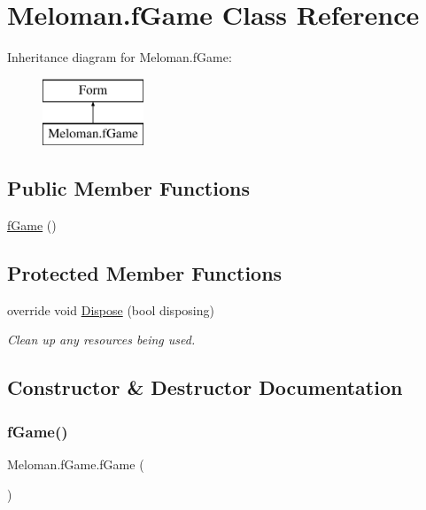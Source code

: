 \hypertarget{class_meloman_1_1f_game}{}\section{Meloman.\+f\+Game Class Reference}
\label{class_meloman_1_1f_game}
Inheritance diagram for Meloman.\+f\+Game\+:\begin{figure}[H]
\begin{center}
\leavevmode
\includegraphics[height=2.000000cm]{class_meloman_1_1f_game}
\end{center}
\end{figure}
\subsection*{Public Member Functions}
\begin{DoxyCompactItemize}
\item 
\mbox{\hyperlink{class_meloman_1_1f_game_ae57982857c2cce60ed8e824a179b45b8}{f\+Game}} ()
\end{DoxyCompactItemize}
\subsection*{Protected Member Functions}
\begin{DoxyCompactItemize}
\item 
override void \mbox{\hyperlink{class_meloman_1_1f_game_a66d614ba1a3bbb889dc4c30d54211c30}{Dispose}} (bool disposing)
\begin{DoxyCompactList}\small\item\em Clean up any resources being used. \end{DoxyCompactList}\end{DoxyCompactItemize}


\subsection{Constructor \& Destructor Documentation}
\mbox{\label{class_meloman_1_1f_game_ae57982857c2cce60ed8e824a179b45b8}} 
\subsubsection{\texorpdfstring{fGame()}{fGame()}}
{\footnotesize\ttfamily Meloman.\+f\+Game.\+f\+Game (\begin{DoxyParamCaption}{ }\end{DoxyParamCaption})}



